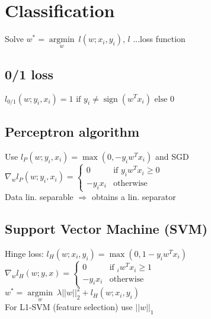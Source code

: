 \section*{Classification}

Solve $w^* = \underset{w}{\operatorname{argmin}} ~ l(w;x_i,y_i)$, $l$ ...loss function

\subsection*{0/1 loss}
$l_{0/1} (w;y_i,x_i) = 1 \text{ if } y_i \neq \operatorname{sign}(w^Tx_i) \text{ else } 0$

\subsection*{Perceptron algorithm}
Use $l_P (w;y_i,x_i) = \operatorname{max}(0, -y_i w^T x_i)$ and SGD\\
$\nabla_w l_P(w;y_i,x_i) = 
\begin{cases}
    0 &\text{if } y_i w^T x_i \geq 0\\
    -y_i x_i &\text{otherwise}
\end{cases}$ \\
Data lin. separable $\Rightarrow$ obtains a lin. separator

\subsection*{Support Vector Machine (SVM)}
Hinge loss: $l_H(w;x_i,y_i) = \operatorname{max}(0,1-y_i w^T x_i)$ \\
$\nabla_w l_H(w;y,x) = 
\begin{cases}
    0 &\text{if } _i w^T x_i \geq 1\\
    -y_i x_i &\text{otherwise}
\end{cases}$\\
$w^* = \underset{w}{\operatorname{argmin}} ~ \lambda||w||_2^2 + l_H(w;x_i,y_i)$\\ For L1-SVM (feature selection) use $||w||_1$ 